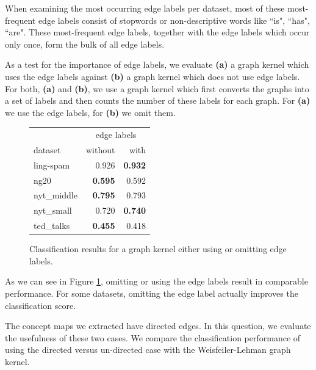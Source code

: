 When examining the most occurring edge labels per dataset, most of these most-frequent edge labels consist of stopwords or non-descriptive words like ``is", ``has", ``are".
These most-frequent edge labels, together with the edge labels which occur only once, form the bulk of all edge labels.

As a test for the importance of edge labels, we evaluate \textbf{(a)} a graph kernel which uses the edge labels against \textbf{(b)} a graph kernel which does not use edge labels.
For both, \textbf{(a)} and \textbf{(b)}, we use a graph kernel which first converts the graphs into a set of labels and then counts the number of these labels for each graph.
For \textbf{(a)} we use the edge labels, for \textbf{(b)} we omit them.

\begin{figure}[htb!]
	\centering
\begin{tabular}{lrr}
	{} & \multicolumn{2}{c}{edge labels} \\
	dataset & without & with \\
	\midrule
	ling-spam  & 0.926 & \textbf{0.932} \\
	ng20       & \textbf{0.595} & 0.592 \\
	nyt\_middle & \textbf{0.795} & 0.793 \\
	nyt\_small  & 0.720 &\textbf{ 0.740} \\
	ted\_talks  & \textbf{0.455} & 0.418 \\
	\bottomrule
\end{tabular}
\caption{Classification results for a graph kernel either using or omitting edge labels.}\label{fig:edge_label_classification}
\end{figure}

As we can see in Figure \ref{fig:edge_label_classification}, omitting or using the edge labels result in comparable performance.
For some datasets, omitting the edge label actually improves the classification score.


The concept maps we extracted have directed edges.
In this question, we evaluate the usefulness of these two cases.
We compare the classification performance of using the directed versus un-directed case with the Weisfeiler-Lehman graph kernel.

